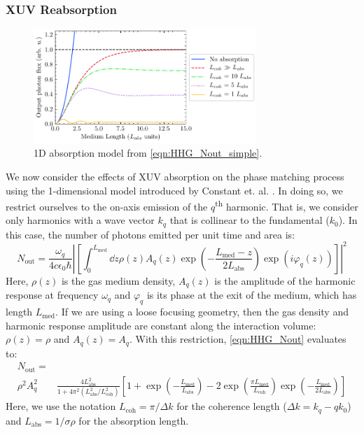 \subsubsection{XUV Reabsorption}
\label{sec:XUV_reabsorption}

\begin{figure}
	\centering
	\includegraphics[width=0.75\textwidth]{figures/chap1/Constant1999_fig1.pdf}
	\caption{1D absorption model from \cref{eqn:HHG_Nout_simple}.}
	\label{fig:Constant1999_fig1}
\end{figure}

We now consider the effects of XUV absorption on the phase matching process using the 1-dimensional model introduced by Constant et. al. \cite{constantOptimizingHighHarmonic1999}. In doing so, we restrict ourselves to the on-axis emission of the $q$\textsuperscript{th} harmonic. That is, we consider only harmonics with a wave vector $k_q$ that is collinear to the fundamental ($k_0$). In this case, the number of photons emitted per unit time and area is:
\begin{equation}
N_{\textrm{out}} = \frac{\omega_q}{4 c \epsilon_0 \hbar} \left| \left[ \int_{0}^{L_{\textrm{med}}} \dd{z} \rho(z) A_q(z) \exp \left( - \frac{L_{\textrm{med}} - z}{2 L_{\textrm{abs}}}  \right) \exp \left( i \varphi_q(z) \right)  \right] \right|^2
\label{eqn:HHG_Nout}
\end{equation}
Here, $\rho(z)$ is the gas medium density, $A_q(z)$ is the amplitude of the harmonic response at frequency $\omega_q$ and $\varphi_q$ is its phase at the exit of the medium, which has length $L_{\textrm{med}}$. If we are using a loose focusing geometry, then the gas density and harmonic response amplitude are constant along the interaction volume: $\rho(z) = \rho$ and $A_q(z)=A_q$. With this restriction, \cref{eqn:HHG_Nout} evaluates to:
\begin{equation}
\begin{aligned}
N_{\textrm{out}} = & \\ \rho^2 A_q^2 & \frac{4L_{\textrm{abs}}^2}{1+4\pi^2(L_{\textrm{abs}}^2 / L_{\textrm{coh}}^2)} \left[ 1 + \exp\left(-\frac{L_{\textrm{med}}}{L_{\textrm{abs}}}\right) - 2 \exp\left(\frac{\pi L_{\textrm{med}}}{L_{\textrm{coh}}}\right) \exp\left(-\frac{L_{\textrm{med}}}{2L_{\textrm{abs}}}\right) \right]
\label{eqn:HHG_Nout_simple}
\end{aligned}
\end{equation}
Here, we use the notation $L_{\textrm{coh}} = \pi/\Delta k$ for the coherence length ($\Delta k = k_q - q k_0$) and $L_{\textrm{abs}} = 1/{\sigma \rho}$ for the absorption length.

